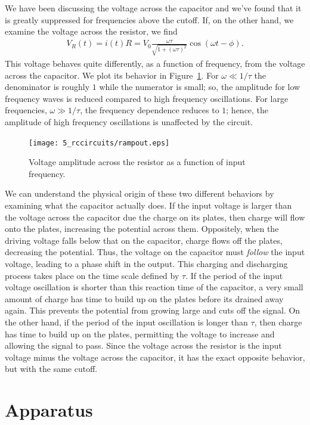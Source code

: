 We have been discussing the voltage across the capacitor and we've found that
it is greatly suppressed for frequencies above the cutoff. If, on the other 
hand, we examine the voltage across the resistor, we find
\begin{eqnarray*}
V_R(t) = i(t)R = V_0 \frac{\omega \tau}{\sqrt{1+(\omega \tau)^2}}
         \cos(\omega t - \phi ).
\end{eqnarray*}
This voltage behaves quite differently, as a function of frequency, from the 
voltage across the capacitor. We plot its behavior in 
Figure~\ref{fig:RC:amplitude2}. For $\omega \ll 1/\tau$ the denominator is 
roughly $1$ while the numerator is small; so, the amplitude for low frequency 
waves is reduced compared to high frequency oscillations. For large 
frequencies, $\omega \gg 1/\tau$, the frequency dependence reduces to $
1$; hence, the amplitude of high frequency oscillations is unaffected by the 
circuit.
\begin{figure}[htb]
\centering 
\epsfxsize=10cm \texttt{[image: 5\_rccircuits/rampout.eps]}
\caption{Voltage amplitude across the resistor as a function of input 
frequency.}
\label{fig:RC:amplitude2}
\end{figure}  

We can understand the physical origin of these two different behaviors by 
examining what the capacitor actually does. If the input voltage is larger than
the voltage across the capacitor due the charge on its plates, then charge will
flow onto the plates, increasing the potential across them. Oppositely, when 
the driving voltage falls below that on the capacitor, charge flows off the plates, decreasing the potential. Thus, the voltage on the capacitor must 
{\em follow} the input voltage, leading to a phase shift in the output. This 
charging and discharging process takes place on the time scale defined by 
$\tau$. If the period of the input voltage oscillation is shorter than this
reaction time of the capacitor, a very small amount of charge has time to 
build up on the plates before its drained away again. This prevents the 
potential from growing large and cuts off the signal. On the other hand, if 
the period of the input oscillation is longer than $\tau$, then charge has 
time to build up on the plates, permitting the voltage to increase and allowing
the signal to pass. Since the voltage across the resistor is the input voltage
minus the voltage across the capacitor, it has the exact opposite behavior, but
with the same cutoff.

\section{Apparatus}

